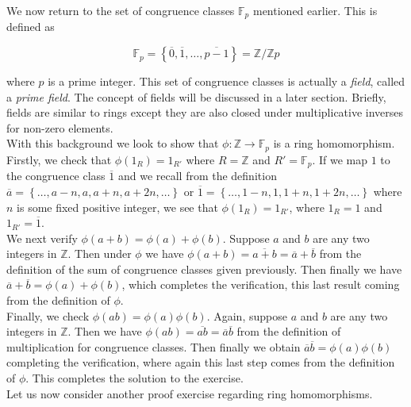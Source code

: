 We now return to the set of congruence classes $\mathbb{F}_{p}$ mentioned earlier.  This is defined as 

\begin{displaymath}
\mathbb{F}_{p}=\left\{\overline{0}, \overline{1}, \ldots, \overline{p-1} \right\}=\mathbb{Z}/\mathbb{Z}p
\end{displaymath}

where $p$ is a prime integer.  This set of congruence classes is actually a \textit{field}, called a \textit{prime field}.  The concept of fields will be discussed in a later section.  Briefly, fields are similar to rings except they are also closed under multiplicative inverses for non-zero elements.\\

With this background we look to show that $\phi: \mathbb{Z} \longrightarrow \mathbb{F}_{p}$ is a ring homomorphism.\\

Firstly, we check that $\phi(1_{R})=1_{R'}$ where $R=\mathbb{Z}$ and $R'=\mathbb{F}_{p}$.  If we map $1$ to the congruence class $\overline{1}$ and we recall from the definition $\overline{a}=\left\{\ldots, a-n, a, a+n, a+2n, \ldots \right\}$ or $\overline{1}=\left\{\ldots, 1-n, 1, 1+n, 1+2n, \ldots \right\}$ where $n$ is some fixed positive integer, we see that $\phi(1_{R})=1_{R'}$, where $1_{R}=1$ and $1_{R'}=\overline{1}$.\\

We next verify $\phi(a+b)=\phi(a)+\phi(b)$.  Suppose $a$ and $b$ are any two integers in $\mathbb{Z}$.  Then under $\phi$ we have $\phi(a+b)=\overline{a+b}=\overline{a}+\overline{b}$ from the definition of the sum of congruence classes given previously.  Then finally we have $\overline{a}+\overline{b}=\phi(a)+\phi(b)$, which completes the verification, this last result coming from the definition of $\phi$.\\

Finally, we check $\phi(ab)=\phi(a)\phi(b)$.  Again, suppose $a$ and $b$ are any two integers in $\mathbb{Z}$.  Then we have $\phi(ab)=\overline{ab}=\overline{a}\overline{b}$ from the definition of multiplication for congruence classes.  Then finally we obtain $\overline{a}\overline{b}=\phi(a)\phi(b)$ completing the verification, where again this last step comes from the definition of $\phi$.  This completes the solution to the exercise.\\

Let us now consider another proof exercise regarding ring homomorphisms.\\

